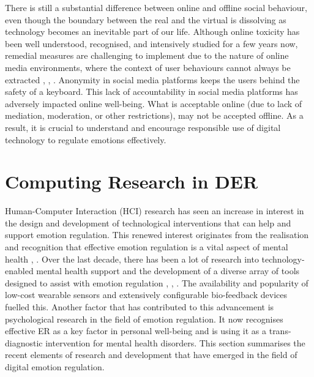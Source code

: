 \documentclass[lettersize,journal]{IEEEtran}
\begin{document}
There is still a substantial difference between online and offline social behaviour, even though the boundary between the real and the virtual is dissolving as technology becomes an inevitable part of our life. Although online toxicity has been well understood, recognised, and intensively studied for a few years now, remedial measures are challenging to implement due to the nature of online media environments, where the context of user behaviours cannot always be extracted \cite{slovak2022designing}, \cite{tag2022emotion}, \cite{thomas2022s}. Anonymity in social media platforms keeps the users behind the safety of a keyboard. This lack of accountability in social media platforms has adversely impacted online well-being. What is acceptable online (due to lack of mediation, moderation, or other restrictions), may not be accepted offline. As a result, it is crucial to understand and encourage responsible use of digital technology to regulate emotions effectively.


\section{Computing Research in DER}
Human-Computer Interaction (HCI) research has seen an increase in interest in the design and development of technological interventions that can help and support emotion regulation. This renewed interest originates from the realisation and recognition that effective emotion regulation is a vital aspect of mental health \cite{gross2015emotion}, \cite{davidson1998affective}. Over the last decade, there has been a lot of research into technology-enabled mental health support and the development of a diverse array of tools designed to assist with emotion regulation \cite{wadley2020digital}, \cite{smith2022digital}, \cite{slovak2022designing}. The availability and popularity of low-cost wearable sensors and extensively configurable bio-feedback devices fuelled this. Another factor that has contributed to this advancement is psychological research in the field of emotion regulation. It now recognises effective ER as a key factor in personal well-being and is using it as a trans-diagnostic intervention for mental health disorders. This section summarises the recent elements of research and development that have emerged in the field of digital emotion regulation. 
\end{document}
